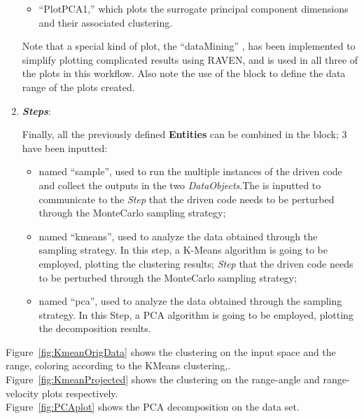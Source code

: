 \begin{enumerate}
\begin{itemize}
       \item ``PlotPCA1,'' which plots the surrogate principal component dimensions and their associated clustering.
     \end{itemize}
     Note that a special kind of plot, the ``dataMining'' , has been implemented to simplify plotting complicated results using RAVEN, and is used in all three of the plots in this workflow.  Also note the use of the  block to define the data range of the plots created.
   \item \textbf{\textit{Steps}}:

   Finally, all the previously defined \textbf{Entities} can be combined in
   the  block;
   3  have been inputted:
   \begin{itemize}
     \item {} named ``sample'', used to run the
     multiple
     instances of the driven code and
     collect the outputs in the two \textit{DataObjects}.The  is inputted to communicate to the
     \textit{Step} that the driven code needs to
     be perturbed through the MonteCarlo sampling strategy;
     \item {} named ``kmeans'', used
     to analyze the data obtained through the sampling strategy. In
     this step, a K-Means algorithm is going to be employed, plotting
     the clustering results;
     \textit{Step} that the driven code needs to
     be perturbed through the MonteCarlo sampling strategy;
     \item {} named ``pca'', used
     to analyze the data obtained through the sampling strategy. In
     this Step, a PCA algorithm is going to be employed, plotting
     the decomposition results.
   \end{itemize}
\end{enumerate}
Figure~\ref{fig:KmeanOrigData} shows the clustering on the input space and the range, coloring according to the KMeans clustering,.
\\Figure~\ref{fig:KmeanProjected} shows the clustering on the range-angle and range-velocity plots respectively.
\\Figure~\ref{fig:PCAplot} shows the PCA decomposition on the data set.
